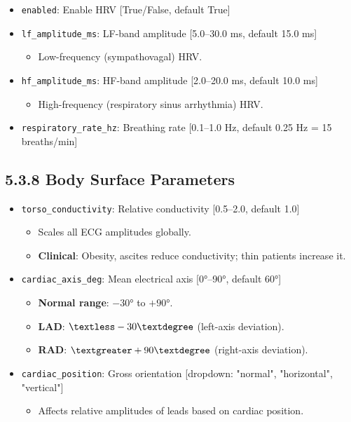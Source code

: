 \documentclass[12pt,oneside,a4paper]{book}
\newcommand{\code}[1]{\texttt{#1}}
\begin{document}
\begin{itemize}
  \item \code{enabled}: Enable HRV [True/False, default True]
  \item \code{lf\_amplitude\_ms}: LF-band amplitude [5.0--30.0 ms, default 15.0 ms]
    \begin{itemize}
      \item Low-frequency (sympathovagal) HRV.
    \end{itemize}
  \item \code{hf\_amplitude\_ms}: HF-band amplitude [2.0--20.0 ms, default 10.0 ms]
    \begin{itemize}
      \item High-frequency (respiratory sinus arrhythmia) HRV.
    \end{itemize}
  \item \code{respiratory\_rate\_hz}: Breathing rate [0.1--1.0 Hz, default 0.25 Hz = 15 breaths/min]
\end{itemize}

\subsection{5.3.8 Body Surface Parameters}

\begin{itemize}
  \item \code{torso\_conductivity}: Relative conductivity [0.5--2.0, default 1.0]
    \begin{itemize}
      \item Scales all ECG amplitudes globally.
      \item \textbf{Clinical}: Obesity, ascites reduce conductivity; thin patients increase it.
    \end{itemize}
  \item \code{cardiac\_axis\_deg}: Mean electrical axis [0°--90°, default 60°]
    \begin{itemize}
      \item \textbf{Normal range}: $-30°$ to $+90°$.
      \item \textbf{LAD}: $\textless -30°$ (left-axis deviation).
      \item \textbf{RAD}: $\textgreater +90°$ (right-axis deviation).
    \end{itemize}
  \item \code{cardiac\_position}: Gross orientation [dropdown: "normal", "horizontal", "vertical"]
    \begin{itemize}
      \item Affects relative amplitudes of leads based on cardiac position.
    \end{itemize}
\end{itemize}
\end{document}
